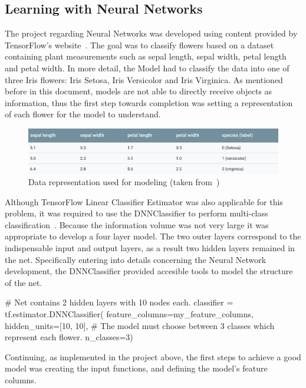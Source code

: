 \subsection{Learning with Neural Networks}

The project regarding Neural Networks was developed using content provided by TensorFlow's website~\cite{tensor18}. The goal was to classify flowers based on a dataset containing plant measurements such as sepal length, sepal width, petal length and petal width. In more detail, the Model had to classify the data into one of three Iris flowers: Iris Setosa, Iris Versicolor and Iris Virginica. 
As mentioned before in this document, models are not able to directly receive objects as information, thus the first step towards completion was setting a representation of each flower for the model to understand. 

\begin{figure}[htbp]
  \centering
  \includegraphics[width=\textwidth]{images/table}
  \caption{Data representation used for modeling (taken from~\cite{tensor18})}
  \label{fig: rep}
\end{figure}

Although TensorFlow Linear Classifier Estimator was also applicable for this problem, it was required to use the DNNClassifier to perform multi-class classification~\cite{tensor18}. Because the information volume was not very large it was appropriate to develop a four layer model. The two outer layers correspond to the indispensable input and output layers, as a result  two hidden layers remained in the net. Specifically entering into details concerning the Neural Network development, the DNNClassifier  provided accesible tools to model the structure of the net.

\begin{tensorflow}[caption={ads}]
# Net contains 2 hidden layers with 10 nodes each.
classifier = tf.estimator.DNNClassifier(
    feature_columns=my_feature_columns,
    hidden_units=[10, 10],
# The model must choose between 3 classes which represent each flower.
    n_classes=3)
\end{tensorflow}

Continuing, as implemented in the project above, the first steps to achieve a good model was creating the input functions, and defining the model's feature columns. 

